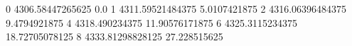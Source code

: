 0 4306.58447265625 0.0
1 4311.59521484375 5.0107421875
2 4316.06396484375 9.4794921875
4 4318.490234375 11.90576171875
6 4325.3115234375 18.72705078125
8 4333.81298828125 27.228515625

